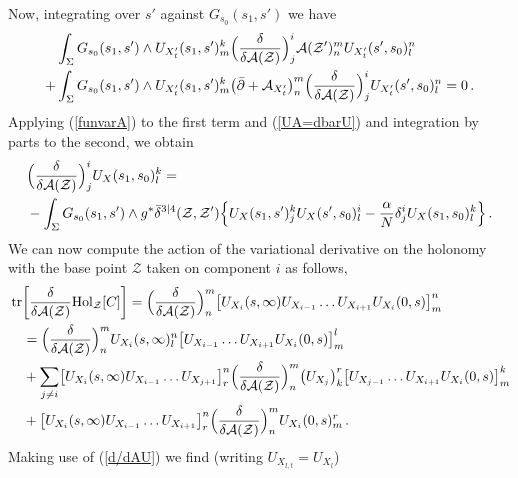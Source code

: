 \documentclass[12pt]{article}
\def \tr {\mathop{\rm tr}\nolimits}
\numberwithin{equation}{section}
\begin{document}
Now, integrating over $s'$ against $G_{s_0}(s_1,s')$ we have
\begin{align}
    &\int_\Sigma G_{s_0}(s_1,s') \wedge U_{X^\prime_t}(s_1,s')^k_m \Bigl(\frac{\delta}{\delta \mathcal{A}(\mathcal{Z})}\Bigr)^i_j \mathcal{A}(\mathcal{Z}')^m_n U_{X^\prime_t}(s',s_0)^n_l \notag \\
    +&\int_\Sigma G_{s_0}(s_1,s') \wedge U_{X^\prime_t}(s_1,s')^k_m  \bigl(\bar{\partial} + \mathcal{A}_{X^\prime_t}\bigr)^m_n \Bigl(\frac{\delta}{\delta \mathcal{A}(\mathcal{Z})}\Bigr)^i_jU_{X^\prime_t}(s',s_0)^n_l = 0\,.
\end{align}
Applying (\ref{funvarA}) to the first term and (\ref{UA=dbarU}) and integration by parts to the second, we obtain
\begin{align}
&\Bigl(\frac{\delta}{\delta \mathcal{A}(\mathcal{Z})}\Bigr)^i_jU_{X}(s_1,s_0)^k_l = \notag\\ 
&-\int_\Sigma G_{s_0}(s_1,s') \wedge g^* \bar{\delta}^{3|4}(\mathcal{Z},\mathcal{Z'}) \Bigl\{U_{X}(s_1,s')^k_j  U_{X}(s',s_0)^i_l -\frac{\alpha}{N}\delta^i_j U_{X}(s_1,s_0)^k_l \Bigr\}\,. 
\label{d/dAU}
\end{align}
We can now compute the action of the variational derivative on the holonomy with the base point $\mathcal{Z}$ taken on component $i$ as follows,
\begin{align}
&\tr \biggl[   \frac{\delta}{\delta \mathcal{A}(\mathcal{Z})}{\rm Hol}_{\mathcal{Z}}[C]\biggr] = \Bigl(\frac{\delta}{\delta \mathcal{A}(\mathcal{Z})}\Bigr)^m_n \bigl[U_{X_i}(s,\infty) U_{X_{i-1}} \ldots U_{X_{i+1}} U_{X_i}(0,s)\bigr]^n_m\, \notag \\
&\quad = \Bigl(\frac{\delta}{\delta \mathcal{A}(\mathcal{Z})}\Bigr)^m_n U_{X_i}(s,\infty)^n_l \bigl[U_{X_{i-1}} \ldots U_{X_{i+1}} U_{X_i}(0,s)\bigr]^l_m \notag \\
&\quad +\sum_{j \neq i} \bigl[ U_{X_i}(s,\infty) U_{X_{i-1}}\ldots U_{X_{j+1}}\bigr]^n_r \Bigl(\frac{\delta}{\delta \mathcal{A}(\mathcal{Z})}\Bigr)^m_n \bigl(U_{X_j}\bigr)^r_k \bigl[U_{X_{j-1}} \ldots U_{X_{i+1}} U_{X_i}(0,s)\bigr]^k_m \notag \\
&\quad + \bigl[U_{X_i}(s,\infty) U_{X_{i-1}} \ldots U_{X_{i+1}}\bigr]^n_r \Bigl(\frac{\delta}{\delta \mathcal{A}(\mathcal{Z})}\Bigr)^m_n U_{X_i}(0,s)^r_m\,.
\end{align}
Making use of (\ref{d/dAU}) we find (writing $U_{X_{l,t}} = U_{X_l}$)
\end{document}
